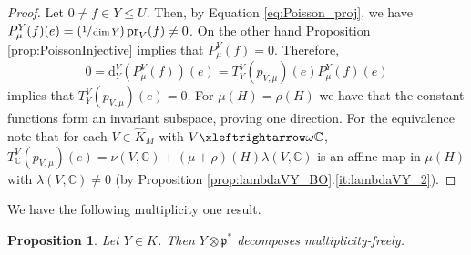 \documentclass[JEP,XML,SOM,NoFloatCountersInSection,Unicode,published]{cedram}
\newcommand{\Psfrac}[2]{(\sfrac{#1}{#2})}
\newtheorem{proposition}[theorem]{Proposition}
\theoremstyle{definition}
\newcommand{\lraomega}{\ensuremath{\xleftrightarrow\omega}}
\newcommand{\mf}[1]{\ensuremath{\mathfrak{#1}}}
\newcommand{\on}[1]{\ensuremath{\operatorname{#1}}}
\newcommand{\rhoa}{\ensuremath{\rho}}
\newcommand{\C}{\ensuremath{\mathbb{C}}}
\begin{document}
\begin{proof}
Let $0\neq f\in Y\leq U$. Then, by Equation \eqref{eq:Poisson_proj}, we have $P_\mu^Y(f)(e)=\Psfrac{1}{\dim Y}\on{pr}_V(f)\neq 0$. On the other hand Proposition \ref{prop:PoissonInjective} implies that $P_\mu^V(f)=0$. Therefore,
\[
0=\mathrm{d}_Y^V(P_\mu^V(f))(e)=T_Y^V(p_{V,\mu})(e)P_\mu^Y(f)(e)
\]
implies that $T_Y^V(p_{V,\mu})(e)=0$. For $\mu(H)=\rhoa(H)$ we have that the constant functions form an invariant subspace, proving one direction. For the equivalence note that for each $V\in\hat K_M$ with $V\lraomega\C$, $T_{\C}^V(p_{V,\mu})(e)=\nu(V,\C)+(\mu+\rhoa)(H)\lambda(V,\C)$ is an affine map in $\mu(H)$ with $\lambda(V,\C)\neq0$ (by Proposition \ref{prop:lambdaVY_BO}.\ref{it:lambdaVY_2}).
\end{proof}

We have the following multiplicity one result.
\begin{proposition}\label{prop:mult_one}
Let $Y\in\hat K$. Then $Y\otimes\mf p^*$ decomposes multiplicity-freely.
\end{proposition}
\end{document}
